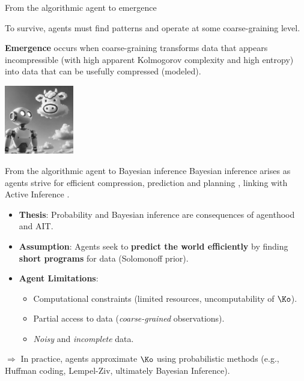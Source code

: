 \begin{frame}[label=emergence]{From the algorithmic agent to emergence}

To survive, agents must find patterns and operate at some coarse-graining level.

\begin{definition}[Emergence]
  \textbf{Emergence} occurs when coarse-graining transforms data that appears incompressible (with high apparent Kolmogorov complexity and high entropy) into data that can be usefully compressed (modeled)\cite{ruffiniNavigatingComplexityHow2024}.
\end{definition}

\begin{center} 
  \includegraphics[height=3cm]{img/robot_emergence.png}
  \end{center}

\end{frame}





\begin{frame}{From the algorithmic agent to Bayesian inference}
Bayesian inference arises as agents strive for efficient compression, prediction and planning \cite{ruffiniNavigatingComplexityHow2024}, linking with Active Inference \cite{parr2022active}.
\begin{itemize}
    \item \textbf{Thesis}: Probability and Bayesian inference are consequences of agenthood and AIT.
    \item \textbf{Assumption}: Agents seek to \textbf{predict the world efficiently} by finding \textbf{short programs} for data (Solomonoff prior).
    \item \textbf{Agent Limitations}:
    \begin{itemize}
        \item Computational constraints (limited resources, uncomputability of $\Ko$).
        \item Partial access to data (\textit{coarse-grained} observations).
        \item \textit{Noisy} and \textit{incomplete} data.
    \end{itemize}
\end{itemize}
\vfill
    
    $\Rightarrow$  In practice, agents approximate $\Ko$ using probabilistic methods  (e.g., Huffman coding, Lempel-Ziv, ultimately Bayesian Inference).
\end{frame}


